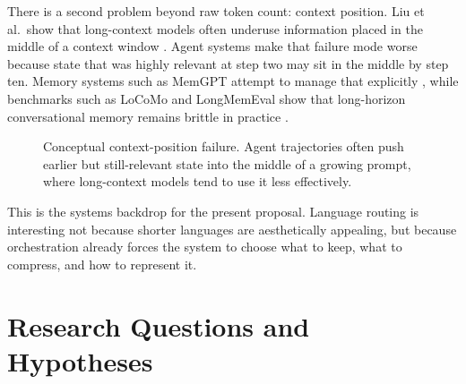 \documentclass[11pt]{article}
\begin{document}
There is a second problem beyond raw token count: context position. Liu et al.\ show that long-context models often underuse information placed in the middle of a context window \cite{liu2024lostmiddle}. Agent systems make that failure mode worse because state that was highly relevant at step two may sit in the middle by step ten. Memory systems such as MemGPT attempt to manage that explicitly \cite{packer2023memgpt}, while benchmarks such as LoCoMo and LongMemEval show that long-horizon conversational memory remains brittle in practice \cite{maharana2024locomo,wu2024longmemeval}.

\begin{figure}[t]
\centering
{}
\caption{Conceptual context-position failure. Agent trajectories often push earlier but still-relevant state into the middle of a growing prompt, where long-context models tend to use it less effectively.}
\label{fig:lost-middle}
\end{figure}

This is the systems backdrop for the present proposal. Language routing is interesting not because shorter languages are aesthetically appealing, but because orchestration already forces the system to choose what to keep, what to compress, and how to represent it.

\section{Research Questions and Hypotheses}
\end{document}
